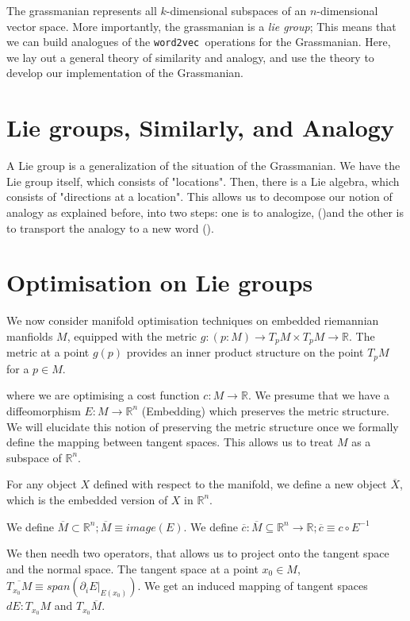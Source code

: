 \documentclass[11pt]{book}
\newcommand{\wtov}{\texttt{word2vec }}
\begin{document}
The grassmanian represents all $k$-dimensional subspaces of an $n$-dimensional
vector space. More importantly, the grassmanian is a \emph{lie group}; This means
that we can build analogues of the \wtov operations for the Grassmanian. Here,
we lay out a general theory of similarity and analogy, and use the theory to
develop our implementation of the Grassmanian.


\section{Lie groups, Similarly, and Analogy}
A Lie group is a generalization of the situation of the Grassmanian. We have the Lie group itself,
which consists of "locations". Then, there is a Lie algebra, which consists of "directions at a location".
This allows us to decompose  our notion of analogy as explained before, into two steps: one is to analogize,
()and the other is to transport the analogy to a new word ().

\section{Optimisation on Lie groups}

We now consider manifold optimisation techniques on embedded riemannian manfiolds $M$,
equipped with the metric $g: (p: M) \rightarrow T_p M  \times T_p M \rightarrow \mathbb R$.
The metric at a point $g(p)$ provides an inner product structure on the point $T_pM$
for a $p \in M$.

where we are optimising a cost function $c: M \rightarrow \mathbb R$.
We presume that we have a diffeomorphism $E: M \rightarrow \mathbb R^n$ (Embedding) which
preserves the metric structure. We will elucidate this notion of preserving
the metric structure once we formally define the mapping between tangent spaces.
This allows us to treat $M$ as a subspace of $\mathbb R^n$.

For any object $X$
defined with respect to the manifold, we define a new object $\overline X$, which
is the embedded version of $X$ in $\mathbb R^n$.

We define $\overline M \subset \mathbb R^n; \overline M \equiv image(E)$.
We define $\overline c: \overline M \subseteq \mathbb R^n \rightarrow \mathbb R; \overline c \equiv c \circ E^{-1}$

We then needh two operators, that allows us to project onto the tangent space
and the normal space. The tangent space at a point $x_0 \in M$, $\overline{T_{x_0} M} \equiv span(\partial_i E |_{E(x_0)})$. 
We get an induced mapping of tangent spaces $dE: T_{x_0} M$ and $T_{x_0} \overline M$.
\end{document}
